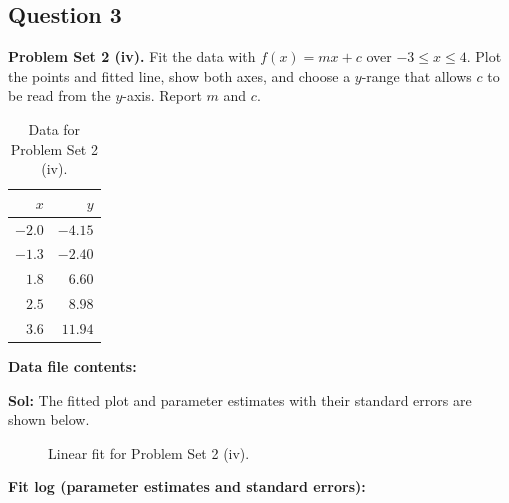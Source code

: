 \documentclass{book}
\begin{document}
\subsection*{Question 3}
\noindent\textbf{Problem Set 2 (iv).} Fit the data with $f(x)=mx+c$ over $-3\le x\le4$. Plot the points and fitted line, show both axes, and choose a $y$-range that allows $c$ to be read from the $y$-axis. Report $m$ and $c$.
\begin{table}[H]
\centering
\caption{Data for Problem Set 2 (iv).}
\begin{tabular}{|r|r|}
\hline
$x$ & $y$ \\ \hline
$-2.0$ & $-4.15$ \\ \hline
$-1.3$ & $-2.40$ \\ \hline
$1.8$ & $6.60$ \\ \hline
$2.5$ & $8.98$ \\ \hline
$3.6$ & $11.94$ \\ \hline
\end{tabular}
\end{table}
\noindent\textbf{Data file contents:}

\noindent\textbf{Sol:} The fitted plot and parameter estimates with their standard errors are shown below.

\begin{figure}[H]
    \centering
    
    \caption{Linear fit for Problem Set 2 (iv).}
\end{figure}
\noindent\textbf{Fit log (parameter estimates and standard errors):}

\newpage
\end{document}
